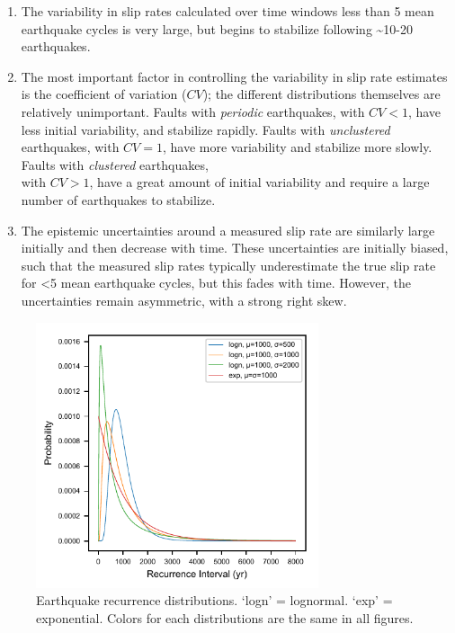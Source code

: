 \documentclass[se, manuscript]{copernicus}
\begin{document}
\begin{enumerate}
\def\labelenumi{\arabic{enumi}.}
\item
  The variability in slip rates calculated over time windows less than 5
  mean earthquake cycles is very large, but begins to stabilize
  following \textasciitilde{}10-20 earthquakes.
\item
  The most important factor in controlling the variability in slip rate
  estimates is the coefficient of variation (\(CV\)); the different
  distributions themselves are relatively unimportant. Faults with
  \emph{periodic} earthquakes, with \(CV < 1\), have less initial
  variability, and stabilize rapidly. Faults with \emph{unclustered}
  earthquakes, with \(CV = 1\), have more variability and stabilize
  more slowly. Faults with \emph{clustered} earthquakes,\\
  with \(CV > 1\), have a great amount of initial variability and
  require a large number of earthquakes to stabilize.
\item
  The epistemic uncertainties around a measured slip rate are similarly
  large initially and then decrease with time. These uncertainties are
  initially biased, such that the measured slip rates typically
  underestimate the true slip rate for \textless{}5 mean earthquake
  cycles, but this fades with time. However, the uncertainties remain
  asymmetric, with a strong right skew.
\end{enumerate}







\clearpage

\begin{figure}[t]
\includegraphics[width=8.3cm]{./figures/recurrence_dists.pdf}
\caption{Earthquake recurrence distributions. `logn' = lognormal. `exp' = 
  exponential. Colors for each distributions are the same in all figures. 
  \label{eq_rec_dists}}
\end{figure}
\end{document}
